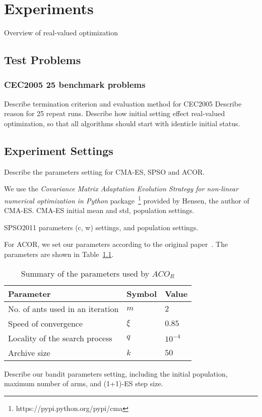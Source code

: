 \chapter{Experiments}
\label{c:experiments}

Overview of real-valued optimization

\section{Test Problems}

\subsection{CEC2005 25 benchmark problems}
Describe termination criterion and evaluation method for CEC2005
Describe reason for 25 repeat runs.
Describe how initial setting effect real-valued optimization, so that all algorithms should start with identicle initial status.


\section{Experiment Settings}

Describe the parameters setting for CMA-ES, SPSO and ACOR.

We use the \textit{Covariance Matrix Adaptation Evolution Strategy for non-linear numerical optimization in Python} package~\footnote{https://pypi.python.org/pypi/cma} provided by Hensen, the author of CMA-ES.
CMA-ES initial mean and std, population settings.

SPSO2011 parameters (c, w) settings, and population settings.

For ACOR, we set our parameters according to the original paper~\cite{Socha:2008:ACOR}. 
The parameters are shown in Table~\ref{table:ACOR_parameters}.


\begin{table}%
\centering
\label{table:ACOR_parameters}
\begin{tabular}{lll}
\hline
Parameter                        & Symbol   & Value          \\ \hline
No. of ants used in an iteration & $m$      & $2$            \\
Speed of convergence             & $\xi$    & $0.85$         \\
Locality of the search process   & $q$      & $10^{-4}$      \\
Archive size                     & $k$      & $50$           \\ \hline
\end{tabular}
\caption{Summary of the parameters used by $ACO_R$}
\end{table}


Describe our bandit parameters setting, including the initial population, maximum number of arms, and (1+1)-ES step size.

